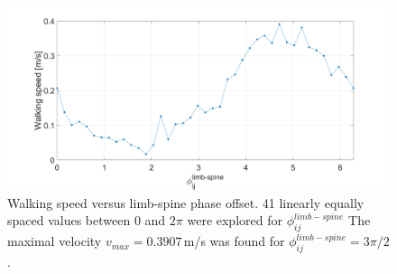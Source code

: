 \documentclass[a4paper]{scrartcl}
\begin{document}
{\begin{figure}
 \centering
 \includegraphics[width=\linewidth]{Figures/figure2A.png}
 \caption{\label{fig:walking_speed} Walking speed versus limb-spine phase offset. 41 linearly equally spaced values between $0$ and $2\pi$ were explored for $\phi_{ij}^{limb-spine}$ The maximal velocity $v_{max} = 0.3907$\,m/s was found for $\phi_{ij}^{limb-spine} = 3\pi/2$.}
\end{figure}

}
\end{document}
